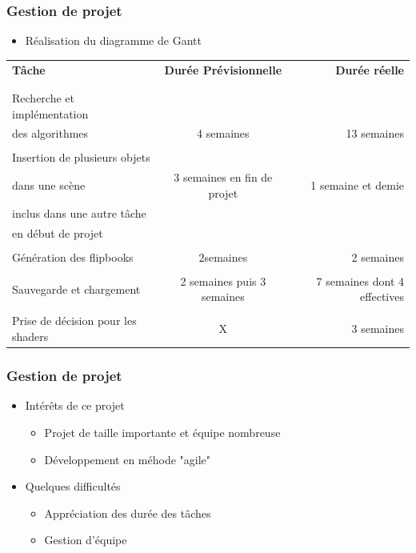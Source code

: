 \documentclass{beamer}
\begin{document}
\begin{frame}
\frametitle{Gestion de projet}
\begin{itemize}[label=$\bullet$]
\item Réalisation du diagramme de Gantt
\end{itemize}
{\fontsize{7}{8}\selectfont
{}
\begin{tabular}{lcr}

\textbf{Tâche} & \textbf{Durée Prévisionnelle} & \textbf{Durée réelle} \\
\\
\hline
\\
Recherche et implémentation \\des algorithmes &
4 semaines & 13 semaines \\
\hline
\\
Insertion de plusieurs objets \\ dans une scène &
3 semaines en fin de projet & 
1 semaine et demie \\ inclus dans 
une autre tâche \\ en début de projet \\
\hline
\\
Génération des flipbooks & 2semaines & 2 semaines \\
\hline
\\
Sauvegarde et chargement & 2 semaines puis 3 semaines &
7 semaines dont 4 effectives \\
\hline
\\
Prise de décision pour les shaders & X & 3 semaines\\

\end{tabular}
}
\end{frame}


\begin{frame}
\frametitle{Gestion de projet}
\begin{itemize}[label=$\bullet$]
\item Intérêts de ce projet
	\begin{itemize}[label=$\circ$]
	\item Projet de taille importante et équipe nombreuse
	\item Développement en méhode "agile"
	\end{itemize}
\item Quelques difficultés
	\begin{itemize}[label=$\circ$]
	\item Appréciation des durée des tâches
	\item Gestion d'équipe
	\end{itemize}
\end{itemize}
\end{frame}
\end{document}
